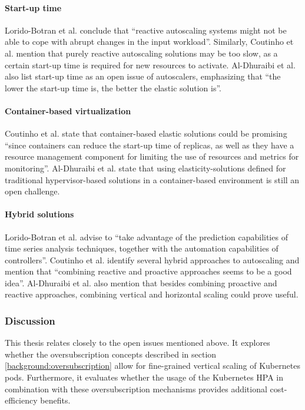 \paragraph{Start-up time} 
Lorido-Botran et al. conclude that ``reactive autoscaling systems might not be able to cope with abrupt changes in the input workload''. Similarly, Coutinho et al. mention that purely reactive autoscaling solutions may be too slow, as a certain start-up time is required for new resources to activate. Al-Dhuraibi et al. also list start-up time as an open issue of autoscalers, emphasizing that ``the lower the start-up time is, the better the elastic solution is''. \citep{Lorido-BotranTania2014ARoA}\citep{CoutinhoEmanuel2015Eicc}\citep{Al-DhuraibiYahya2018EiCC}

\paragraph{Container-based virtualization}
Coutinho et al. state that container-based elastic solutions could be promising ``since containers can reduce the start-up time of replicas, as well as they have a resource management component for limiting the use of resources and metrics for monitoring''. Al-Dhuraibi et al. state that using elasticity-solutions defined for traditional hypervisor-based solutions in a container-based environment is still an open challenge. \citep{CoutinhoEmanuel2015Eicc}\citep{Al-DhuraibiYahya2018EiCC}

\paragraph{Hybrid solutions} Lorido-Botran et al. advise to ``take advantage of the prediction capabilities of time series analysis techniques, together with the automation capabilities of controllers''. Coutinho et al. identify several hybrid approaches to autoscaling and mention that ``combining reactive and proactive approaches seems to be a good idea''. Al-Dhuraibi et al. also mention that besides combining proactive and reactive approaches, combining vertical and horizontal scaling could prove useful. \citep{Lorido-BotranTania2014ARoA}\citep{CoutinhoEmanuel2015Eicc}\citep{Al-DhuraibiYahya2018EiCC}

\subsubsection{Discussion}
This thesis relates closely to the open issues mentioned above. It explores whether the oversubscription concepts described in section \ref{background:oversubscription} allow for fine-grained vertical scaling of Kubernetes pods. Furthermore, it evaluates whether the usage of the Kubernetes HPA in combination with these oversubscription mechanisms provides additional cost-efficiency benefits.

